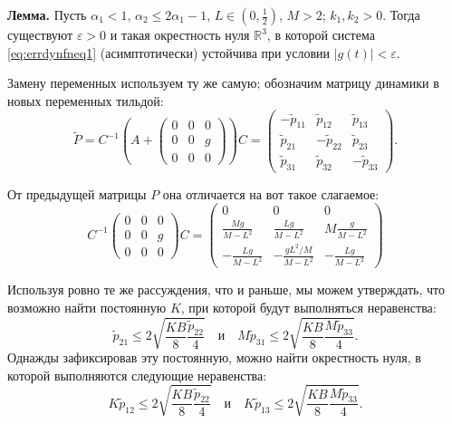 \documentclass{article}
\begin{document}
{\bf Лемма.} Пусть $\alpha_1<1$, $\alpha_2\leqslant2\alpha_1-1$, $L\in \left(0,\frac{1}{2}\right)$, $M>2$; $k_1,k_2>0$. 
Тогда существуют $\varepsilon>0$ и такая окрестность нуля $\mathbb R^3$, в которой система \eqref{eq:errdynfneq1} (асимптотически) устойчива при условии $|g(t)|<\varepsilon$.

Замену переменных используем ту же самую; обозначим матрицу динамики в новых переменных тильдой:
$$
\tilde P= C^{-1}
\left(A+
  \begin{pmatrix}
  0&0&0
 \\[1mm]
 0&0&g
 \\[1mm]
 0&0&0 \end{pmatrix}
 \right)
 C=
 \begin{pmatrix}-\tilde p_{11}&\tilde p_{12}&\tilde p_{13}\\
 \tilde p_{21}&-\tilde p_{22}&\tilde p_{23}\\
 \tilde p_{31}&\tilde p_{32}&-\tilde p_{33}\end{pmatrix}.
$$

От предыдущей матрицы $P$ она отличается на вот такое слагаемое:
$$
 C^{-1}
  \begin{pmatrix}
  0&0&0
 \\[1mm]
 0&0&g
 \\[1mm]
 0&0&0 \end{pmatrix}
 C=
 \begin{pmatrix}
  0&0&0
 \\[1mm]
\frac{Mg}{M-L^2}&\frac{Lg}{M-L^2} &M\frac{g}{M-L^2}
 \\[1mm]
-\frac{ Lg}{M-L^2}&-\frac{gL^2/M }{M-L^2}&-\frac{Lg}{M-L^2} \end{pmatrix}
$$

Используя ровно те же рассуждения, что и раньше, мы можем утверждать, что возможно найти постоянную $K$, при которой будут выполняться неравенства:
\begin{equation}
\label{eq:p21p31n}
\tilde p_{21} \leqslant 2 \sqrt{\frac{KB}{8}\frac{\tilde p_{22}}{4}} \quad \text{и} \quad M \tilde p_{31} \leqslant 2  \sqrt{\frac{KB}{8}\frac{M \tilde p_{33}}{4}}.
\end{equation}
Однажды зафиксировав эту постоянную, можно найти окрестность нуля, в которой выполняются следующие неравенства:
\begin{equation}
\label{eq:p12p13n}
K \tilde p_{12} \leqslant 2 \sqrt{\frac{KB}{8}\frac{\tilde p_{22}}{4}} \quad \text{и} \quad  K \tilde p_{13} \leqslant 2  \sqrt{\frac{KB}{8}\frac{M \tilde p_{33}}{4}}.
\end{equation}
\end{document}
